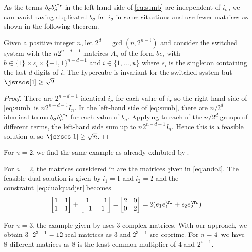 \documentclass[11pt,twoside,a4paper,openright]{uclouvain-thesis}
\begin{document}
As the terms $b_\sigma b_\sigma^\Tr$ in the left-hand
side of \eqref{eq:sumb} are independent of $i_\sigma$,
we can avoid having duplicated $b_\sigma$ for $i_\sigma$
in some situations and use fewer matrices as shown in the following theorem.

\begin{mytheo}
  \label{theo:binexred}
  Given a positive integer $n$, let $2^d = \gcd(n, 2^{n-1})$ and
  consider the switched system with the $n2^{n-d-1}$ matrices $A_\sigma$
  of the form $be_i$ with $b \in \{1\} \times s_i \times \{-1, 1\}^{n-d-1}$ and $i \in \{1, \ldots, n\}$
  where $s_i$ is the singleton containing the last $d$ digits of $i$.
  The hypercube is invariant for the switched system but $\jsrsos[1] \ge \sqrt{2}$.
  \begin{proof}
    There are $2^{n-d-1}$ identical $i_\sigma$ for each value of $i_\sigma$ so
    the right-hand side of \eqref{eq:sumb} is $n2^{n-d-1}I_n$.
    In the left-hand side of \eqref{eq:sumb}, there are $n/2^d$ identical terms $b_\sigma b_\sigma^\Tr$ for each value of $b_\sigma$.
    Applying  to each of the $n/2^d$ groups of different terms, the left-hand side sum up to $n2^{n-d-1}I_n$.
    Hence this is a feasible solution of 
    so $\jsrsos[1] \ge \sqrt{n}$.
  \end{proof}
\end{mytheo}

For $n = 2$, we find the same example as already exhibited by \cite{ando1998simultaneous}.
\begin{myexem}
  For $n = 2$, the matrices considered in  are the matrices given in \eqref{eq:ando2}.
  The feasible dual solution is given by $i_1 = 1$ and $i_2 = 2$
  and the constraint~\eqref{eq:dualquadjsr} becomes
  \[
    \begin{bmatrix}
      1 & 1\\
      1 & 1
    \end{bmatrix}
    +
    \begin{bmatrix}
      1 & -1\\
      -1 & 1
    \end{bmatrix}
    =
    \begin{bmatrix}
      2 & 0\\
      0 & 2
    \end{bmatrix}
    =
    2 (e_1 e_1^\Tr + e_2 e_2^\Tr)
  \]
\end{myexem}

For $n = 3$, the example given by \cite{ando1998simultaneous} uses 3 complex matrices.
With our approach, we obtain $3 \cdot 2^{3-1} = 12$ real matrices as $3$ and $2^{3-1}$ are coprime.
For $n = 4$, we have 8 different matrices as 8 is the least common multiplier of $4$ and $2^{4-1}$.
\end{document}
